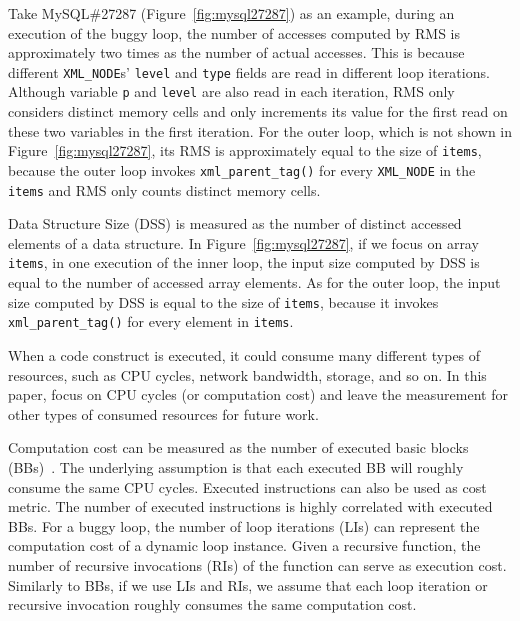 Take MySQL\#27287 (Figure~\ref{fig:mysql27287}) as an example, 
during an execution of the buggy loop, the number of accesses
computed by RMS is approximately 
two times as the number of actual accesses. 
This is because different \texttt{XML\_NODE}s' \texttt{level} and \texttt{type} 
fields are read in different loop iterations. 
Although variable \texttt{p} and \texttt{level} are also read in each iteration,
RMS only considers distinct memory cells and 
only increments its value for the first read on these 
two variables in the first iteration. 
For the outer loop, which is not shown in Figure~\ref{fig:mysql27287}, 
its RMS is approximately equal to the size of \texttt{items}, 
because the outer loop invokes \texttt{xml\_parent\_tag()} for every
\texttt{XML\_NODE} in the \texttt{items} and RMS only 
counts distinct memory cells. 


Data Structure Size (DSS) is measured as
the number of distinct accessed elements of a data structure.  
%
In Figure~\ref{fig:mysql27287}, if we focus on array \texttt{items},
in one execution of the inner loop, the input size computed by DSS 
is equal to the number of accessed array elements. 
As for the outer loop, the input size computed by DSS  is
equal to the size of  \texttt{items}, because
it invokes \texttt{xml\_parent\_tag()} for every element in \texttt{items}.


When a code construct is executed,
it could consume many different types of resources, 
such as CPU cycles, network bandwidth, storage, and so on.
In this paper, focus on CPU cycles (or computation cost) 
and leave the measurement for other types of 
consumed resources for future work.

Computation cost can be measured 
as the number of executed basic blocks (BBs)~\cite{Aprof1,Aprof2}.
The underlying assumption is that each executed 
BB will roughly consume the same CPU cycles. 
Executed instructions can also be used as cost metric. 
The number of executed instructions is highly correlated with executed BBs.
For a buggy loop, the number of loop iterations (LIs) can represent 
the computation cost of a dynamic loop instance.
Given a recursive function, the number of recursive invocations (RIs) 
of the function can serve as execution cost.
Similarly to BBs, if we use LIs and RIs, 
we assume that each loop iteration or recursive invocation 
roughly consumes the same computation cost. 



